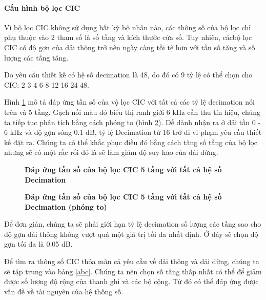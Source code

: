 \paragraph{Cấu hình bộ lọc CIC}
Vì bộ lọc CIC không sử dụng bất kỳ bộ nhân nào, các thông số của bộ lọc chỉ phụ thuộc vào 2 tham số là số tầng và kích thước cửa số. Tuy nhiên, cácbộ lọc CIC có độ gợn của dải thông trở nên ngày càng tồi tệ hơn với tần số tăng và số lượng các tầng tăng.

Do yêu cầu thiết kế có hệ số decimation là 48, do đó có 9 tỷ lệ có thể chọn cho CIC: 2 3 4 6 8 12 16 24 48.

Hình \ref{cic_ratios_overview} mô tả đáp ứng tần số của vộ lọc CIC với tất cả các tỷ lệ decimation nói trên và 5 tầng. Gạch nối màu đỏ biểu thị ranh giới 6 kHz cần thu tín hiệu, chúng ta tiếp tục phân tích bằng cách phóng to (hình \ref{cic_ratios_zoom}). Dễ dành nhận ra ở dải tần 0 - 6 kHz và độ gợn sóng 0.1 dB, tỷ lệ Decimation từ 16 trở đi vi phạm yêu cầu thiết kế đặt ra. Chúng ta có thể khắc phục điều đó bằng cách tăng số tầng của bộ lọc nhưng sẽ có một rắc rối đó là sẽ làm giảm độ suy hao của dải dừng.

\begin{figure}[H]
    \centering
    
    \caption[Đáp ứng tần số của bộ lọc CIC 5 tầng với tất cả hệ số Decimation]{\bfseries \fontsize{12pt}{0pt}\selectfont Đáp ứng tần số của bộ lọc CIC 5 tầng với tất cả hệ số Decimation}
    \label{cic_ratios_overview}
\end{figure}

\begin{figure}[H]
    \centering
    
    \caption[Đáp ứng tần số của bộ lọc CIC 5 tầng với tất cả hệ số Decimation (phóng to)]{\bfseries \fontsize{12pt}{0pt}\selectfont Đáp ứng tần số của bộ lọc CIC 5 tầng với tất cả hệ số Decimation (phóng to)}
    \label{cic_ratios_zoom}
\end{figure}

Để đơn giản, chúng ta sẽ phải giới hạn tỷ lệ decimation số lượng các tầng sao cho độ gợn dải thông không vượt quá một giá trị tối đa nhất định. Ở đây sẽ chọn độ gợn tối đa là 0.05 dB.

Để tìm ra thông số CIC thỏa mãn cả yêu cầu về dải thông và dải dừng, chúng ta sẽ tập trung vào bảng \ref{abc}. Chúng ta nên chọn số tầng thấp nhất có thể để giảm được số lượng độ rộng của thanh ghi và các bộ cộng. Từ đó có thể đáp ứng được vấn đề về tài nguyên của hệ thống số.


